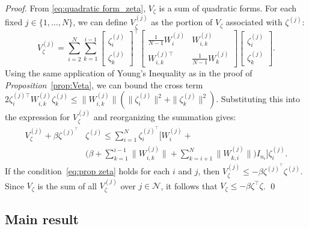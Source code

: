\documentclass{ifacconf}
\begin{document}
\begin{proof}
From \eqref{eq:quadratic form_zeta}, $V_\zeta$ is a sum of quadratic forms. For each fixed $j \in \{1, \dots, N\}$, we can define $V_\zeta^{(j)}$ as the portion of $V_\zeta$ associated with $\zeta^{(j)}$:
\[V_\zeta^{(j)} = \sum_{i=2}^{N}\sum_{k=1}^{i-1} \begin{bmatrix} 
\zeta_i^{(j)} \\ \zeta_k^{(j)} \end{bmatrix}^\top \begin{bmatrix} 
\frac{1}{N-1}W_i^{(j)} & W_{i,k}^{(j)} \\ W_{i,k}^{(j)\top} & 
\frac{1}{N-1}W_k^{(j)} \end{bmatrix} \begin{bmatrix} \zeta_i^{(j)} \\ 
\zeta_k^{(j)} \end{bmatrix}. \]
Using the same application of Young's Inequality as in the proof of {\it Proposition}~\ref{prop:Veta}, we can bound the cross term $2\zeta_i^{(j)\top} W_{i,k}^{(j)} \zeta_k^{(j)} \le \big\|W_{i,k}^{(j)}\big\| (\|\zeta_i^{(j)}\|^2 + \|\zeta_k^{(j)}\|^2)$.
Substituting this into the expression for $V_\zeta^{(j)}$ and reorganizing the summation gives:
\begin{equation}
    \begin{aligned}
       V_\zeta^{(j)}+\beta\zeta^{(j)^\top}&\zeta^{(j)}\le\sum_{i=1}^{N} \zeta_i^{(j)^\top} \bigg[
 W_i^{(j)}+ \\
         & \bigg(\beta+\sum_{k=1}^{i-1}\big\|W_{i,k}^{(j)}\big\|+\sum_{k=i+1}^{N}\big\|W_{k,i}^{(j)}\big\|\bigg)I_{n_i} \bigg]\zeta_i^{(j)}.
    \end{aligned}\nonumber
\end{equation}
If the condition~\eqref{eq:prop zeta} holds for each $i$ and $j$, then $V_\zeta^{(j)} \le -\beta\zeta^{(j)^\top}\zeta^{(j)}$. Since $V_\zeta$ is the sum of all $V_\zeta^{(j)}$ over $j\in\mathcal{N}$, it follows that $V_\zeta \le -\beta\zeta^\top\zeta$.
    \qed
\end{proof}

\subsection{Main result}
\vspace*{-0.3 cm}
\end{document}
